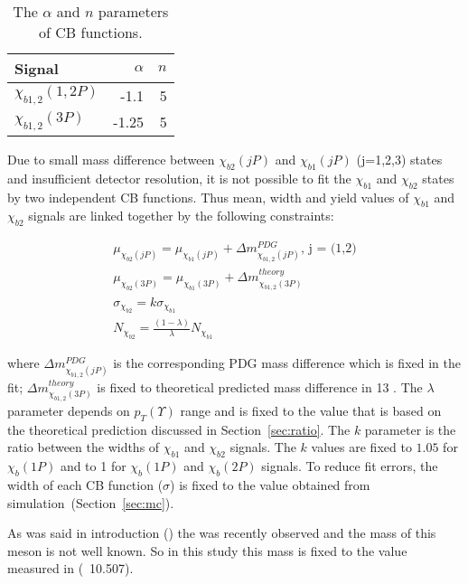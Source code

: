 \begin{table}[H]
\caption{\small   The $\alpha$ and $n$ parameters of CB functions.}
\centering
\begin{tabular}{lrr}
\toprule
Signal & $\alpha$ & $n$ \\
\midrule
$\chi_{b1,2}(1,2P)$ & -1.1 & 5 \\
$\chi_{b1,2}(3P)$ & -1.25 & 5 \\
\bottomrule
\end{tabular}
\label{tab:chib:fit:tail}
\end{table}

Due to small mass difference between $\chi_{b2}(jP)$ and $\chi_{b1}(jP)$ (j=1,2,3) 
states and insufficient detector resolution, it is not possible 
to fit the $\chi_{b1}$ and $\chi_{b2}$ states by two independent CB functions. Thus mean,
width and yield values of  $\chi_{b1}$ and $\chi_{b2}$ signals are linked
together by the following constraints:

\begin{equation}
  \begin{aligned}
\mu_{\chi_{b2}(jP)} = \mu_{\chi_{b1}(jP)} + \Delta m_{\chi_{b1,2}(jP)}^{PDG} \text{, j = (1,2)}\\
\mu_{\chi_{b2}(3P)} = \mu_{\chi_{b1}(3P)} + \Delta m_{\chi_{b1,2}(3P)}^{theory} \\
\sigma_{\chi_{b2}} = k \sigma_{\chi_{b1}}\\
N_{\chi_{b2}} = \frac{(1-\lambda)}{\lambda} N_{\chi_{b1}}
  \end{aligned}
\end{equation}

\noindent where $\Delta m_{\chi_{b1,2}(jP)}^{PDG}$ is the corresponding PDG
mass difference which is fixed in the fit; $\Delta
m_{\chi_{b1,2}(3P)}^{theory}$ is fixed to theoretical predicted mass difference
in 13 \mev. The $\lambda$ parameter depends on $p_T(\Upsilon)$ range and is
fixed to the value that is based on the theoretical prediction discussed in
Section~\ref{sec:ratio}. The $k$ parameter is the ratio between the widths of
$\chi_{b1}$ and $\chi_{b2}$ signals. The $k$ values are fixed to $1.05$ for
$\chi_b(1P)$  and to 1 for $\chi_b(1P)$ and $\chi_b(2P)$ signals. To reduce fit
errors, the width of each CB function ($\sigma$) is fixed to the value obtained
from simulation~(Section~\ref{sec:mc}).

As was said in introduction () the \chibThreeP  was
recently observed and the mass of this meson is not well known.
So in this study this mass is fixed to the value measured in
 (~10.507\gevcc).


